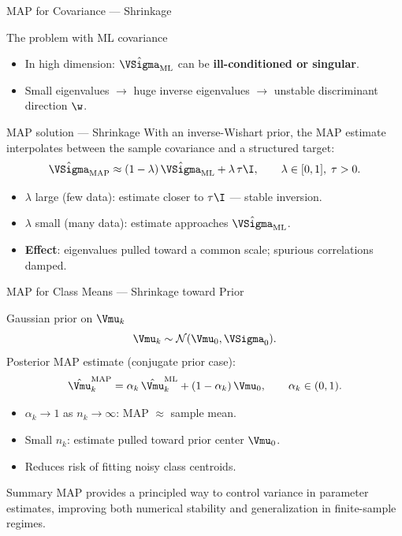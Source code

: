 \begin{frame}{MAP for Covariance — Shrinkage}
  \begin{block}{The problem with ML covariance}
    \begin{itemize}
      \item In high dimension: $\hat\VSigma_{\mathrm{ML}}$ can be \textbf{ill-conditioned or singular}.
      \item Small eigenvalues $\to$ huge inverse eigenvalues $\to$ unstable discriminant direction $\w$.
    \end{itemize}
  \end{block}

  \begin{block}{MAP solution — Shrinkage}
    With an inverse-Wishart prior, the MAP estimate interpolates between the sample covariance
    and a structured target:
    \[
      \hat\VSigma_{\mathrm{MAP}}\approx(1-\lambda)\,\hat\VSigma_{\mathrm{ML}}+\lambda\,\tau\I,
      \qquad\lambda\in[0,1],\;\tau>0.
    \]
    \begin{itemize}
      \item $\lambda$ large (few data): estimate closer to $\tau\I$ — stable inversion.
      \item $\lambda$ small (many data): estimate approaches $\hat\VSigma_{\mathrm{ML}}$.
      \item \textbf{Effect}: eigenvalues pulled toward a common scale; spurious correlations damped.
    \end{itemize}
  \end{block}
\end{frame}

\begin{frame}{MAP for Class Means — Shrinkage toward Prior}
  \begin{block}{Gaussian prior on $\Vmu_k$}
    \[
      \Vmu_k\sim\mathcal{N}(\Vmu_0,\VSigma_0).
    \]
    Posterior MAP estimate (conjugate prior case):
    \[
      \hat\Vmu_k^{\mathrm{MAP}}=\alpha_k\,\hat\Vmu_k^{\mathrm{ML}}+(1-\alpha_k)\,\Vmu_0,
      \qquad\alpha_k\in(0,1).
    \]
    \begin{itemize}
      \item $\alpha_k\to1$ as $n_k\to\infty$: MAP $\approx$ sample mean.
      \item Small $n_k$: estimate pulled toward prior center $\Vmu_0$.
      \item Reduces risk of fitting noisy class centroids.
    \end{itemize}
  \end{block}

  \begin{alertblock}{Summary}
    MAP provides a principled way to control variance in parameter estimates,
    improving both numerical stability and generalization in finite-sample regimes.
  \end{alertblock}
\end{frame}


